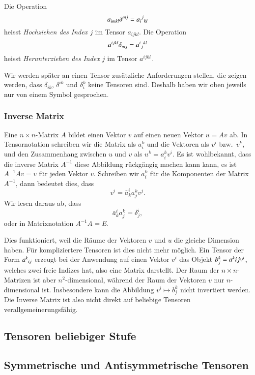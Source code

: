 \begin{definition}
Die Operation
\[
a_{imkl}\delta^{mj}=a_i\mathstrut^j\mathstrut_{kl}
\]
heisst {\em Hochziehen des Index $j$} im Tensor $a_{ijkl}$.
Die Operation
\[
a^{ijkl}\delta_{mj}=a^i\mathstrut_j\mathstrut^{kl}
\]
heisst {\em Herunterziehen des Index $j$} im Tensor $a^{ijkl}$.
\end{definition}

Wir werden später an einen Tensor zusätzliche Anforderungen stellen,
die zeigen werden, dass $\delta_{ik}$, $\delta^{ik}$ und $\delta_i^k$
keine Tensoren sind.
Deshalb haben wir oben jeweils nur von einem Symbol gesprochen.

\subsubsection{Inverse Matrix}
Eine $n\times n$-Matrix $A$ bildet einen Vektor $v$ auf einen
neuen Vektor $u=Av$ ab.
In Tensornotation schreiben wir die Matrix als $a_i^k$ und die Vektoren
als $v^i$ bzw.~$v^k$, und den Zusammenhang zwischen $u$ und $v$ als
$u^k=a_i^kv^i$.
Es ist wohlbekannt, dass die inverse Matrix $A^{-1}$ diese Abbildung
rückgängig machen kann kann, es ist $A^{-1}Av=v$ für jeden Vektor $v$.
Schreiben wir  $\bar a_i^k$ für die Komponenten der Matrix $A^{-1}$,
dann bedeutet dies, dass
\[
v^i = \bar a^i_ka_j^kv^j.
\]
Wir lesen daraus ab, dass
\[
\bar a_k^i a_j^k = \delta^i_j,
\]
oder in Matrixnotation $A^{-1}A=E$.

Dies funktioniert, weil die Räume der Vektoren $v$ und $u$ die gleiche
Dimension haben.
Für kompliziertere Tensoren ist dies nicht mehr möglich.
Ein Tensor der Form $a^k\mathstrut_{ij}$ erzeugt bei der Anwendung
auf einen Vektor $v^i$ das Objekt $b^k_j=a^k\mathstrut{ij}v^i$, welches
zwei freie Indizes hat, also eine Matrix darstellt.
Der Raum der $n\times n$-Matrizen ist aber $n^2$-dimensional, während
der Raum der Vektoren $v$ nur $n$-dimensional ist.
Insbesondere kann die Abbildung $v^i\mapsto b^k_j$ nicht invertiert
werden.
Die Inverse Matrix ist also nicht direkt auf beliebige Tensoren 
verallgemeinerungsfähig.

\subsection{Tensoren beliebiger Stufe}
\subsection{Symmetrische und Antisymmetrische Tensoren}
